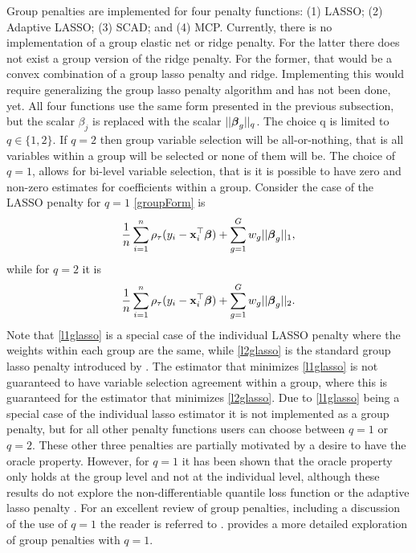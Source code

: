 \documentclass[article]{rqPenVignette}%
\newcommand{\vx}{{\bf x}}
\newcommand{\vbeta}{\mbox{\boldmath $\beta$}}
\begin{document}
Group penalties are implemented for four penalty functions: (1) LASSO; (2) Adaptive LASSO; (3) SCAD; and (4) MCP. Currently, there is no implementation of a group elastic net or ridge penalty. For the latter there does not exist a group version of the ridge penalty. For the former, that would be a convex combination of a group lasso penalty and ridge. Implementing this would require generalizing the group lasso penalty algorithm and has not been done, yet. All four functions use the same form presented in the previous subsection, but the scalar $\beta_j$ is replaced with the scalar $||\vbeta_g||_q$. The choice q is limited to $q \in \{1,2\}$. If $q=2$ then group variable selection will be all-or-nothing, that is all variables within a group will be selected or none of them will be. The choice of $q=1$, allows for bi-level variable selection, that is it is possible to have zero and non-zero estimates for coefficients within a group. Consider the case of the LASSO penalty for $q=1$ \eqref{groupForm} is 
\begin{equation}
\label{l1glasso}
\frac{1}{n} \sum_{i=1}^n \rho_\tau(y_i - \vx_i^\top\vbeta) + \sum_{g=1}^G w_g||\vbeta_g||_1,
\end{equation}
while for $q=2$ it is 
\begin{equation}
\label{l2glasso}
\frac{1}{n} \sum_{i=1}^n \rho_\tau(y_i - \vx_i^\top\vbeta) + \sum_{g=1}^G w_g||\vbeta_g||_2.
\end{equation}
Note that \eqref{l1glasso} is a special case of the individual LASSO penalty where the weights within each group are the same, while \eqref{l2glasso} is the standard group lasso penalty introduced by \citet{yuan2007}. The estimator that minimizes \eqref{l1glasso} is not guaranteed to have variable selection agreement within a group, where this is guaranteed for the estimator that minimizes \eqref{l2glasso}. Due to \eqref{l1glasso} being a special case of the individual lasso estimator it is not implemented as a group penalty, but for all other penalty functions users can choose between $q=1$ or $q=2$. These other three penalties are partially motivated by a desire to have the oracle property. However, for $q=1$ it has been shown that the oracle property only holds at the group level and not at the individual level, although these results do not explore the non-differentiable quantile loss function or the adaptive lasso penalty \citep{mestatp}. For an excellent review of group penalties, including a discussion of the use of $q=1$ the reader is referred to \citet{groupReview}. \citet{penBiLevel} provides a more detailed exploration of group penalties with $q=1$. 
\end{document}
